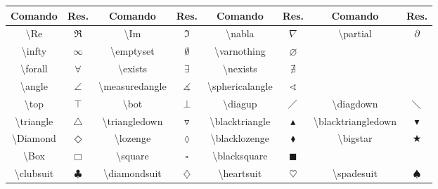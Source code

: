 % 
% 
% 
% 
% 
\begin{tabular}{cc|cc|cc|cc}
    \hline
    Comando & Res. & Comando & Res. & Comando & Res. & Comando & Res. \\ \hline
    \textbackslash\textsf{Re} & $\Re$ & \textbackslash\textsf{Im} & $\Im$ & \textbackslash\textsf{nabla} & $\nabla$ & \textbackslash\textsf{partial} & $\partial$  \\
    \textbackslash\textsf{infty} & $\infty$ & \textbackslash\textsf{emptyset} & $\emptyset$ & \textbackslash\textsf{varnothing} & $\varnothing$ \\
    \textbackslash\textsf{forall} & $\forall$ & \textbackslash\textsf{exists} & $\exists$ & \textbackslash\textsf{nexists} & $\nexists$ \\
    \textbackslash\textsf{angle} & $\angle$ & \textbackslash\textsf{measuredangle} & $\measuredangle$ & \textbackslash\textsf{sphericalangle} & $\sphericalangle$ \\
    \textbackslash\textsf{top} & $\top$ & \textbackslash\textsf{bot} & $\bot$ & \textbackslash\textsf{diagup} & $\diagup$ & \textbackslash\textsf{diagdown} & $\diagdown$ \\
    \textbackslash\textsf{triangle} & $\triangle$ & \textbackslash\textsf{triangledown} & $\triangledown$ & \textbackslash\textsf{blacktriangle} & $\blacktriangle$ & \textbackslash\textsf{blacktriangledown} & $\blacktriangledown$ \\
    \textbackslash\textsf{Diamond} & $\Diamond$ & \textbackslash\textsf{lozenge} & $\lozenge$ & \textbackslash\textsf{blacklozenge} & $\blacklozenge$ & \textbackslash\textsf{bigstar} & $\bigstar$ \\
    \textbackslash\textsf{Box} & $\Box$ & \textbackslash\textsf{square} & $\square$ & \textbackslash\textsf{blacksquare} & $\blacksquare$ \\
    \textbackslash\textsf{clubsuit} & $\clubsuit$ & \textbackslash\textsf{diamondsuit} & $\diamondsuit$ & \textbackslash\textsf{heartsuit} & $\heartsuit$ & \textbackslash\textsf{spadesuit} & $\spadesuit$ \\ \hline
\end{tabular}
